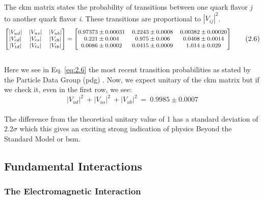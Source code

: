 The \gls{ckm} matrix states the probability of transitions between one quark flavor \textit{j} to another quark flavor \textit{i}.
These transitions are proportional to $|V_{ij}|^2$. 
\\
\begin{equation}\label{eq:2.6}
    \medmath{
    \begin{bmatrix}
        |V_{ud}| & |V_{us}| & |V_{ub}| \\
        |V_{cd}| & |V_{cs}| & |V_{cb}| \\
        |V_{td}| & |V_{ts}| & |V_{tb}| 
    \end{bmatrix}
    =
    \begin{bmatrix}
       0.97373 \pm 0.00031 & 0.2243 \pm 0.0008 & 0.00382 \pm 0.00020 \\
       0.221 \pm 0.004 & 0.975 \pm 0.006 & 0.0408 \pm 0.0014 \\
       0.0086 \pm 0.0002 & 0.0415 \pm 0.0009 & 1.014 \pm 0.029 \\ 
    \end{bmatrix}
    }
\tag{2.6}
\end{equation}
\\
Here we see in Eq. \ref{eq:2.6} the most recent transition probabilities as stated 
by the Particle Data Group (\gls{pdg}) \cite{workman}. Now, we expect unitary of the \gls{ckm} 
matrix but if we check it, even in the first row, we see:
\\
\begin{equation}\label{eq:2.7}
    |V_{ud}|^2 \ + |V_{us}|^2 \ + |V_{ub}|^2 \ = \ 0.9985 \pm 0.0007
\tag{2.7}
\end{equation}
\\
The difference from the theoretical unitary value of 1 has a standard deviation of 2.2$\sigma$ which 
this gives an exciting strong indication of physics Beyond the Standard Model or \gls{bsm}. 
\\
\subsection{Fundamental Interactions}
\subsubsection{The Electromagnetic Interaction}

